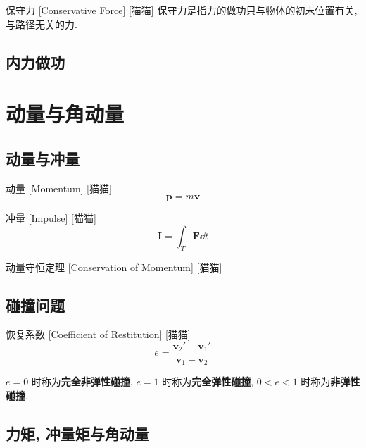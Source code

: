 \documentclass[UTF8]{ctexart}
\begin{document}
        \begin{dfn}
            []
            {保守力}
            [Conservative Force]
            [猫猫]
            保守力是指力的做功只与物体的初末位置有关, 与路径无关的力. 
        \end{dfn}
    
    \subsection{内力做功}
        

\section{动量与角动量}

    \subsection{动量与冲量}
        
        \begin{dfn}
            []
            {动量}
            [Momentum]
            [猫猫]
            \[\bm{p}=m\bm{v}\]
        \end{dfn}
        
        \begin{dfn}
            []
            {冲量}
            [Impulse]
            [猫猫]
            \[\bm{I}=\int_T\bm{F}\dd t\]
        \end{dfn}
        
        \begin{thm}
            []
            {动量守恒定理}
            [Conservation of Momentum]
            [猫猫]
        \end{thm}
    
    \subsection{碰撞问题}
        
        \begin{dfn}
            []
            {恢复系数}
            [Coefficient of Restitution]
            [猫猫]
            \[e=\frac{\bm{v}_2'-\bm{v}_1'}{\bm{v}_1-\bm{v}_2}\]

            \(e=0\) 时称为\textbf{完全非弹性碰撞}, \(e=1\) 时称为\textbf{完全弹性碰撞}, \(0<e<1\) 时称为\textbf{非弹性碰撞}. 
        \end{dfn}

    \subsection{力矩, 冲量矩与角动量}
        
\end{document}
